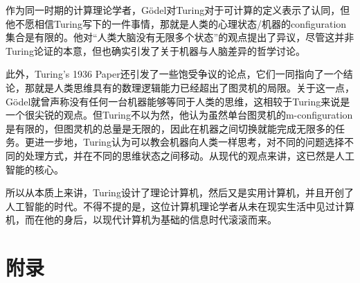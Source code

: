 \documentclass[8pt]{article}
\begin{document}
作为同一时期的计算理论学者，G\"odel对Turing对于可计算的定义表示了认同，但他不愿相信Turing写下的一件事情，那就是人类的心理状态/机器的configuration集合是有限的。他对“人类大脑没有无限多个状态”的观点提出了异议，尽管这并非Turing论证的本意，但也确实引发了关于机器与人脑差异的哲学讨论。

此外，Turing's 1936 Paper还引发了一些饱受争议的论点，它们一同指向了一个结论，那就是人类思维具有的数理逻辑能力已经超出了图灵机的局限。关于这一点，G\"odel就曾声称没有任何一台机器能够等同于人类的思维，这相较于Turing来说是一个很尖锐的观点。但Turing不以为然，他认为虽然单台图灵机的m-configuration是有限的，但图灵机的总量是无限的，因此在机器之间切换就能完成无限多的任务。更进一步地，Turing认为可以教会机器向人类一样思考，对不同的问题选择不同的处理方式，并在不同的思维状态之间移动。从现代的观点来讲，这已然是人工智能的核心。

所以从本质上来讲，Turing设计了理论计算机，然后又是实用计算机，并且开创了人工智能的时代。不得不提的是，这位计算机理论学者从未在现实生活中见过计算机，而在他的身后，以现代计算机为基础的信息时代滚滚而来。




\iffalse
\section*{附录}
\end{document}
